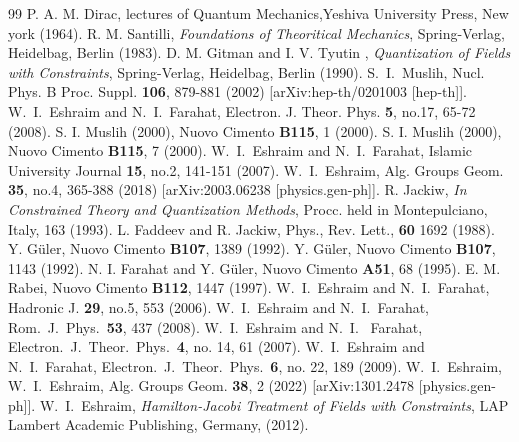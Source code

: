 \documentclass[12pt]{article}
\begin{document}
\begin{thebibliography}{99}
 P. A. M. Dirac, lectures of Quantum Mechanics,Yeshiva University Press, New york (1964).
 R. M. Santilli, \emph{Foundations of Theoritical Mechanics}, Spring-Verlag, Heidelbag, Berlin (1983).
 D. M. Gitman and I. V. Tyutin , \emph{Quantization of Fields with Constraints},  Spring-Verlag, Heidelbag, Berlin (1990).
 S.~I.~Muslih,
Nucl. Phys. B Proc. Suppl. \textbf{106}, 879-881 (2002)
[arXiv:hep-th/0201003 [hep-th]].
W.~I.~Eshraim and N.~I.~Farahat,
Electron. J. Theor. Phys. \textbf{5}, no.17, 65-72 (2008).
S. I. Muslih (2000), Nuovo Cimento {\bf B115}, 1 (2000).
 S. I. Muslih (2000), Nuovo Cimento {\bf B115}, 7 (2000).
W.~I.~Eshraim and N.~I.~Farahat,
Islamic University Journal \textbf{15}, no.2, 141-151 (2007).
W.~I.~Eshraim,
Alg. Groups Geom. \textbf{35}, no.4, 365-388 (2018) [arXiv:2003.06238 [physics.gen-ph]].
 R. Jackiw, \emph{In Constrained Theory and Quantization Methods}, Procc. held in Montepulciano, Italy, 163 (1993).
 L. Faddeev and R. Jackiw, Phys., Rev. Lett., {\bf 60} 1692 (1988).
 Y. G\"{u}ler, Nuovo Cimento  {\bf B107}, 1389 (1992).
 Y. G\"{u}ler, Nuovo Cimento  {\bf B107}, 1143 (1992).
  N. I. Farahat and Y. G\"{u}ler, Nuovo Cimento {\bf A51}, 68 (1995).
 E. M. Rabei, Nuovo Cimento {\bf B112}, 1447 (1997).
 W.~I.~Eshraim and N.~I.~Farahat,
Hadronic J. \textbf{29}, no.5, 553 (2006).
 W.~I.~Eshraim and N.~I.~Farahat,
  Rom.\ J.\ Phys.\  {\bf 53}, 437 (2008).
W.~I.~Eshraim and N.~I.~ Farahat,
 Electron.\ J.\ Theor.\ Phys.\  {\bf 4}, no. 14,  61 (2007).
  W.~I.~Eshraim and N.~I.~Farahat,
  Electron.\ J.\ Theor.\ Phys.\  {\bf 6}, no. 22, 189 (2009).
W.~I.~Eshraim,
W.~I.~Eshraim,
Alg. Groups Geom. \textbf{38}, 2 (2022)
[arXiv:1301.2478 [physics.gen-ph]].
W.~I.~Eshraim,  \emph{Hamilton-Jacobi Treatment of Fields with Constraints}, LAP Lambert Academic Publishing, Germany, (2012).






\end{thebibliography}
\end{document}
